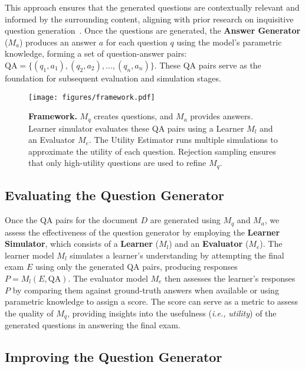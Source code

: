 This approach ensures that the generated questions are contextually relevant and informed by the surrounding content, aligning with prior research on inquisitive question generation~\cite{wu2024questions}.  
Once the questions are generated, the \textbf{Answer Generator} (\( M_a \)) produces an answer \( a \) for each question \( q \) using the model’s parametric knowledge, forming a set of question-answer pairs: \( \text{QA} = \{(q_1, a_1), (q_2, a_2), \dots, (q_n, a_n)\} \). 
These QA pairs serve as the foundation for subsequent evaluation and simulation stages.

\begin{figure}[t!]
    \centering
    \begin{minipage}{\columnwidth}
    \centering
    \texttt{[image: figures/framework.pdf]}
\end{minipage}
\caption{\textbf{\ours Framework.} $M_q$ creates questions, and $M_a$ provides answers.
Learner simulator evaluates these QA pairs using a Learner $M_l$ and an Evaluator $M_e$.
The Utility Estimator runs multiple simulations to approximate the utility of each question.
Rejection sampling ensures that only high-utility questions are used to refine $M_q$.}
\vspace{-0.3cm}
    \label{fig:framework}
\end{figure}

\subsection{Evaluating the Question Generator}
\label{ssec:quest-evaluation}
Once the QA pairs for the document \( D \) are generated using \( M_q \) and \( M_a \), we assess the effectiveness of the question generator by employing the \textbf{Learner Simulator}, which consists of a \textbf{Learner} (\( M_l \)) and an \textbf{Evaluator} (\( M_e \)).
The learner model \( M_l \) simulates a learner's understanding by attempting the final exam \( E \) using only the generated QA pairs, producing responses \( P = M_l(E, \text{QA}) \).
The evaluator model \( M_e \) then assesses the learner’s responses \( P \) by comparing them against ground-truth answers when available or using parametric knowledge to assign a score.
The score can serve as a metric to assess the quality of \( M_q \), providing insights into the usefulness (\textit{i.e.,} \textit{utility}) of the generated questions in answering the final exam.

\subsection{Improving the Question Generator}
\label{ssec:quest-train}

